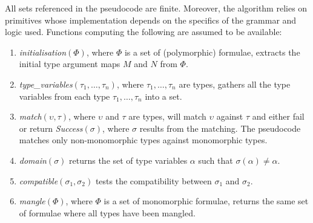 \documentclass[runningheads]{llncs}
\begin{document}
All sets referenced in the pseudocode are %
finite. Moreover, the algorithm relies on primitives whose implementation depends on the specifics of the grammar and logic used. %
Functions computing the following are assumed to be available: 
\begin{enumerate}
   \item[\labelitemi] \emph{initialisation\((\Phi)\)}, where \(\Phi\) is a set of (polymorphic) formulae, extracts the initial type argument maps \(M\) and \(N\) from \(\Phi\).
   \item[\labelitemi] \emph{type\_variables\((\tau_1, \dots, \tau_n)\)}, where \(\tau_1, \dots,\tau_n\) are types, gathers all the type variables from each type \(\tau_1, \dots, \tau_n\) into a set.
   \item[\labelitemi] \emph{match\((\upsilon, \tau)\)}, where \(\upsilon\) and \(\tau\) are types, will match \(\upsilon\) against \(\tau\) and either fail or return \emph{Success\((\sigma)\)}, where \(\sigma\) results from the matching. The pseudocode matches only non-monomorphic types against monomorphic types.
   \item[\labelitemi] \emph{domain\((\sigma)\)} %
   returns the set of type variables \(\alpha\) such that \(\sigma(
   \alpha) \not= \alpha\).
   \item[\labelitemi] \emph{compatible\((\sigma_1, \sigma_2)\)} %
   tests the compatibility between \(\sigma_1\) and \(\sigma_2\).
   \item[\labelitemi] \emph{mangle\((\Phi)\)}, where \(\Phi\) is a set of monomorphic formulae, returns the same set of formulae where all types have been mangled.
\end{enumerate}
\end{document}

